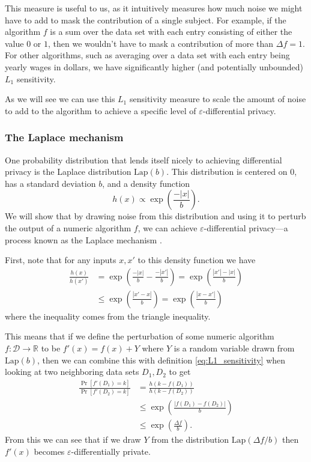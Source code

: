 \documentclass[12pt]{article}
\newcommand{\fancy}{\mathcal}
\renewcommand{\epsilon}{\varepsilon}
\begin{document}
This measure is useful to us, as it intuitively measures how much noise we might have to add to mask the contribution of a single subject. For example, if the algorithm $f$ is a sum over the data set with each entry consisting of either the value $0$ or $1$, then we wouldn't have to mask a contribution of more than $\Delta f = 1$. For other algorithms, such as averaging over a data set with each entry being yearly wages in dollars, we have significantly higher (and potentially unbounded) $L_1$ sensitivity.

As we will see we can use this $L_1$ sensitivity measure to scale the amount of noise to add to the algorithm to achieve a specific level of $\epsilon$-differential privacy.

\subsubsection{The Laplace mechanism}

One probability distribution that lends itself nicely to achieving differential privacy is the Laplace distribution $\text{Lap}(b)$. This distribution is centered on 0, has a standard deviation $b$, and a density function
\begin{equation*}
    h(x)\propto \exp\left(\frac{-|x|}{b}\right).
\end{equation*}
We will show that by drawing noise from this distribution and using it to perturb the output of a numeric algorithm $f$, we can achieve $\epsilon$-differential privacy---a process known as the Laplace mechanism \cite{dworketal2006}. \bigskip

First, note that for any inputs $x,x'$ to this density function we have
\begin{align*}
    \frac{h(x)}{h(x')} &= \exp\left(\frac{-|x|}{b}-\frac{-|x'|}{b}\right) = \exp\left(\frac{|x'|-|x|}{b} \right) \\
        &\leq \exp\left( \frac{|x'-x|}{b} \right) = \exp\left( \frac{|x-x'|}{b} \right)
\end{align*}
where the inequality comes from the triangle inequality.

This means that if we define the perturbation of some numeric algorithm $f: \fancy{D} \to \mathbb{R}$ to be $f'(x) = f(x)+Y$ where $Y$ is a random variable drawn from $\text{Lap}(b)$, then we can combine this with definition \ref{eq:L1_sensitivity} when looking at two neighboring data sets $D_1,D_2$ to get
\begin{align*}
    \frac{\Pr[f'(D_1)=k]}{\Pr[f'(D_2)=k]} &= \frac{h(k - f(D_1))}{h(k - f(D_2))} \\
        &\leq \exp\left( \frac{|f(D_1)-f(D_2)|}{b}\right) \\
        &\leq \exp\left(\frac{\Delta f}{b}\right).
\end{align*}
From this we can see that if we draw $Y$ from the distribution $\text{Lap}(\Delta f/b)$ then $f'(x)$ becomes $\epsilon$-differentially private.
\end{document}
